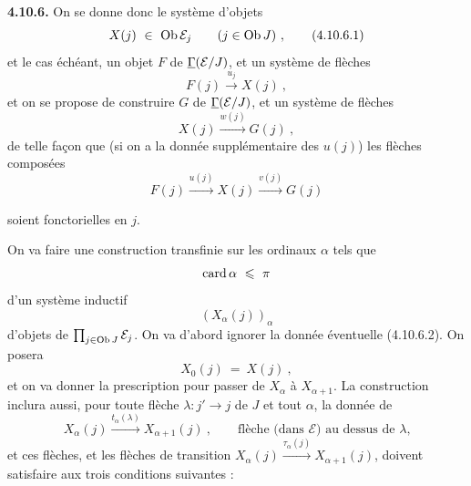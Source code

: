 \textbf{4.10.6.} On se donne donc le système d'objets
\[
X(j)\ \in\ \Ob\mathcal{E}_j \qquad (j\in\Ob J)\ , \tag*{(4.10.6.1)}
\]
et le cas échéant, un objet $F$ de $\underline{\Gamma}(\mathcal{E}/J)$, et un système de flèches
\[
F(j) \xrightarrow{u_j} X(j)\ , \tag*{(4.6.10.2)} %
\]
et on se propose de construire $G$ de $\underline{\Gamma}(\mathcal{E}/J)$, et un système de flèches
\[
X(j) \xrightarrow{w(j)} G(j)\ , \tag*{(4.10.6.3)}
\]
de telle façon que (si on a la donnée supplémentaire des $u(j)$) les flèches composées
\[
F(j) \xrightarrow{u(j)} X(j) \xrightarrow{v(j)} G(j) %
\]

soient fonctorielles en $j$.

On va faire une construction transfinie sur les ordinaux $\alpha$ tels que
\[
\card\alpha\ \leqslant\ \pi
\]
d'un système inductif
\[
(X_\alpha(j))_\alpha
\]
d'objets de $\prod_{j\in\operatorname{Ob} J}\mathcal{E}_j$. On va d'abord ignorer la donnée éventuelle (4.10.6.2). On posera
\[
X_0(j)\ =\ X(j)\ , \tag*{(4.10.6.4)}
\]
et on va donner la prescription pour passer de $X_\alpha$ à $X_{\alpha+1}$. La construction inclura aussi, pour toute flèche $\lambda : j'\longrightarrow j$ de $J$ et tout $\alpha$, la donnée de
\[
X_\alpha(j) \xrightarrow{t_\alpha(\lambda)} X_{\alpha+1}(j)\ , \qquad \text{flèche (dans $\mathcal{E}$) au dessus de $\lambda$,} \tag*{(4.10.6.5)} %
\]
et ces flèches, et les flèches de transition $X_\alpha(j)\xrightarrow{\tau_\alpha(j)}X_{\alpha+1}(j)$, doivent
satisfaire aux trois conditions suivantes :
